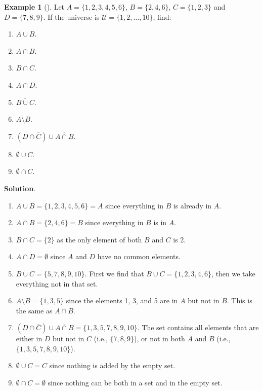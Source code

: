 \documentclass[10pt,]{book}
\theoremstyle{plain}
\theoremstyle{definition}
\theoremstyle{definition}
\newtheorem{example}[theorem]{Example}
\theoremstyle{definition}
\theoremstyle{definition}
\numberwithin{equation}{chapter}
\def\U{\mathcal U}
\def\bar{\overline}
\begin{document}
\begin{example}[]\label{example-43}
\hypertarget{p-1623}{}%
Let \(A = \{1, 2, 3, 4, 5, 6\}\), \(B = \{2, 4, 6\}\), \(C = \{1, 2, 3\}\) and \(D = \{7, 8, 9\}\). If the universe is \(\U = \{1, 2, \ldots, 10\}\), find: \leavevmode%
\begin{enumerate}
\item\hypertarget{li-464}{}\(A \cup B\).%
\item\hypertarget{li-465}{}\(A \cap B\).%
\item\hypertarget{li-466}{}\(B \cap C\).%
\item\hypertarget{li-467}{}\(A \cap D\).%
\item\hypertarget{li-468}{}\(\bar{B \cup C}\).%
\item\hypertarget{li-469}{}\(A \setminus B\).%
\item\hypertarget{li-470}{}\((D \cap \bar C) \cup \bar{A \cap B}\).%
\item\hypertarget{li-471}{}\(\emptyset \cup C\).%
\item\hypertarget{li-472}{}\(\emptyset \cap C\).%
\end{enumerate}
%
\par\smallskip%
\noindent\textbf{Solution}.\hypertarget{solution-134}{}\quad%
\hypertarget{p-1624}{}%
\leavevmode%
\begin{enumerate}
\item\hypertarget{li-473}{}\(A \cup B = \{1, 2, 3, 4, 5, 6\} = A\) since everything in \(B\) is already in \(A\).%
\item\hypertarget{li-474}{}\(A \cap B = \{2, 4, 6\} = B\) since everything in \(B\) is in \(A\).%
\item\hypertarget{li-475}{}\(B \cap C = \{2\}\) as the only element of both \(B\) and \(C\) is 2.%
\item\hypertarget{li-476}{}\(A \cap D = \emptyset\) since \(A\) and \(D\) have no common elements.%
\item\hypertarget{li-477}{}\(\bar{B \cup C} = \{5, 7, 8, 9, 10\}\). First we find that \(B \cup C = \{1, 2, 3, 4, 6\}\), then we take everything not in that set.%
\item\hypertarget{li-478}{}\(A \setminus B = \{1, 3, 5\}\) since the elements 1, 3, and 5 are in \(A\) but not in \(B\). This is the same as \(A \cap \bar B\).%
\item\hypertarget{li-479}{}\((D \cap \bar C) \cup \bar{A \cap B} = \{1, 3, 5, 7, 8, 9, 10\}.\) The set contains all elements that are either in \(D\) but not in \(C\) (i.e., \(\{7,8,9\}\)), or not in both \(A\) and \(B\) (i.e., \(\{1,3,5,7,8,9,10\}\)).%
\item\hypertarget{li-480}{}\(\emptyset \cup C = C\) since nothing is added by the empty set.%
\item\hypertarget{li-481}{}\(\emptyset \cap C = \emptyset\) since nothing can be both in a set and in the empty set.%
\end{enumerate}
%
\end{example}
\end{document}
